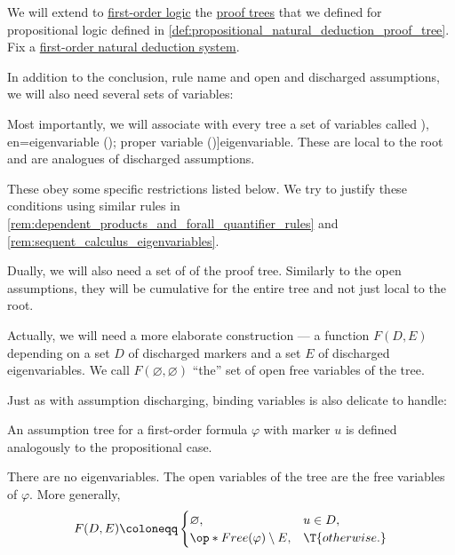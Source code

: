 \begin{definition}\label{def:fol_natural_deduction_proof_tree}
  We will extend to \hyperref[def:first_order_logic]{first-order logic} the \hyperref[def:proof_tree]{proof trees} that we defined for propositional logic defined in \cref{def:propositional_natural_deduction_proof_tree}. Fix a \hyperref[def:fol_natural_deduction_system]{first-order natural deduction system}.

  In addition to the conclusion, rule name and open and discharged assumptions, we will also need several sets of variables:
  \begin{thmenum}[series=def:fol_natural_deduction_proof_tree]
     Most importantly, we will associate with every tree a set of variables called \term[ru=собственная переменная (\cite[145]{Герасимов2014Вычислимость}), en=eigenvariable (\cite[\S 5.1.10]{Mimram2020ProgramEqualsProof}); proper variable (\cite[38]{TroelstraSchwichtenberg2000BasicProofTheory})]{eigenvariable}. These are local to the root and are analogues of discharged assumptions.

    These obey some specific restrictions listed below. We try to justify these conditions using similar rules in \cref{rem:dependent_products_and_forall_quantifier_rules} and \cref{rem:sequent_calculus_eigenvariables}.

     Dually, we will also need a set of  of the proof tree. Similarly to the open assumptions, they will be cumulative for the entire tree and not just local to the root.

    Actually, we will need a more elaborate construction --- a function \( F(D, E) \) depending on a set \( D \) of discharged markers and a set \( E \) of discharged eigenvariables. We call \( F(\varnothing, \varnothing) \) \enquote{the} set of open free variables of the tree.
  \end{thmenum}

  Just as with assumption discharging, binding variables is also delicate to handle:
  \begin{thmenum}[resume=def:fol_natural_deduction_proof_tree]
     An assumption tree for a first-order formula \( \varphi \) with marker \( u \) is defined analogously to the propositional case.
    \begin{thmenum}
       There are no eigenvariables.
       The open variables of the tree are the free variables of \( \varphi \). More generally,
      \begin{equation*}
        F(D, E) \coloneqq \begin{cases}
          \varnothing,                     &u \in D, \\
          \op*{Free}(\varphi) \setminus E, &\T{otherwise.}
        \end{cases}
      \end{equation*}
    \end{thmenum}


\end{thmenum}
\end{definition}

